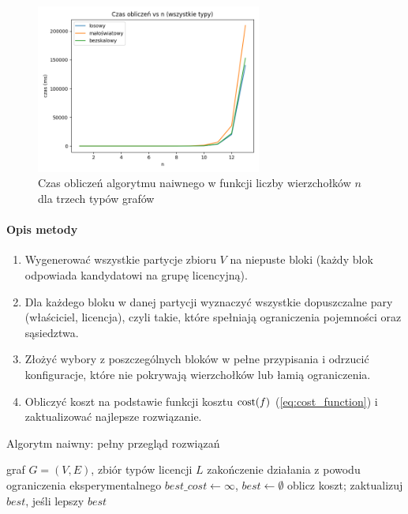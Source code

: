 \begin{figure}[H]
  \centering
  \includegraphics[width=0.66\textwidth]{assets/all_types_plot.png}
  \caption{Czas obliczeń algorytmu naiwnego w funkcji liczby wierzchołków $n$ dla trzech typów grafów}
  \label{fig:all_types_time}
\end{figure}

\paragraph{Opis metody}
\begin{enumerate}
  \item Wygenerować wszystkie partycje zbioru \(V\) na niepuste bloki (każdy blok odpowiada kandydatowi na grupę licencyjną).
  \item Dla każdego bloku w danej partycji wyznaczyć wszystkie dopuszczalne pary (właściciel, licencja), czyli takie, które spełniają ograniczenia pojemności oraz sąsiedztwa.
  \item Złożyć wybory z poszczególnych bloków w pełne przypisania i odrzucić konfiguracje, które nie pokrywają wierzchołków lub łamią ograniczenia.
  \item Obliczyć koszt na podstawie funkcji kosztu $\operatorname{cost}(f)$ (\ref{eq:cost_function}) i zaktualizować najlepsze rozwiązanie.
\end{enumerate}

\begin{algorithm}[H]
  \caption{Algorytm naiwny: pełny przegląd rozwiązań}
  \label{alg:naive}
  \begin{algorithmic}[1]
    \Require graf \(G=(V,E)\), zbiór typów licencji \(L\)
     \State \Return zakończenie działania z powodu ograniczenia eksperymentalnego \EndIf
    \State \(best\_cost \gets \infty\), \(best \gets \emptyset\)
    \State oblicz koszt; zaktualizuj \(best\), jeśli lepszy
    \EndIf
    \EndFor
    \EndFor
    \State \Return \(best\)
  \end{algorithmic}
\end{algorithm}

